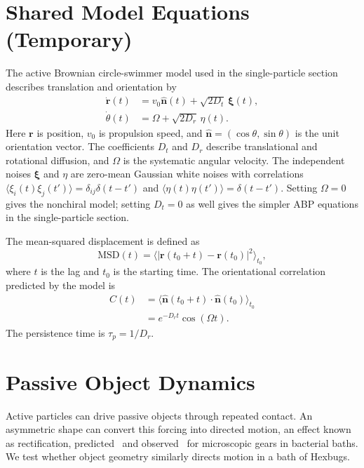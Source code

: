 \documentclass[10pt,twocolumn]{article}
\begin{document}
\section*{Shared Model Equations (Temporary)}
The active Brownian circle-swimmer model used in the single-particle section describes translation and orientation by~\cite{Balda2022,Kiechl2026}
\begin{equation}
  \begin{aligned}
    \dot{\mathbf r}(t)&=v_0\hat{\mathbf n}(t)+\sqrt{2D_t}\,\boldsymbol\xi(t),\\
    \dot\theta(t)&=\Omega+\sqrt{2D_r}\,\eta(t).
  \end{aligned}
  \label{eq:shared_abc}
\end{equation}
Here $\mathbf r$ is position, $v_0$ is propulsion speed, and $\hat{\mathbf n}=(\cos\theta,\sin\theta)$ is the unit orientation vector.
The coefficients $D_t$ and $D_r$ describe translational and rotational diffusion, and $\Omega$ is the systematic angular velocity.
The independent noises $\boldsymbol\xi$ and $\eta$ are zero-mean Gaussian white noises with correlations $\langle\xi_i(t)\xi_j(t')\rangle=\delta_{ij}\delta(t-t')$ and $\langle\eta(t)\eta(t')\rangle=\delta(t-t')$.
Setting $\Omega=0$ gives the nonchiral model; setting $D_t=0$ as well gives the simpler ABP equations in the single-particle section.

The mean-squared displacement is defined as
\begin{equation}
  \mathrm{MSD}(t)=\big\langle|\mathbf r(t_0+t)-\mathbf r(t_0)|^2\big\rangle_{t_0},
  \label{eq:shared_msd}
\end{equation}
where $t$ is the lag and $t_0$ is the starting time.
The orientational correlation predicted by the model is
\begin{equation}
  \begin{aligned}
    C(t)&=\big\langle\hat{\mathbf n}(t_0+t)\cdot\hat{\mathbf n}(t_0)\big\rangle_{t_0}\\
        &=e^{-D_r t}\cos(\Omega t).
  \end{aligned}
  \label{eq:shared_corr}
\end{equation}
The persistence time is $\tau_p=1/D_r$.

\section*{Passive Object Dynamics}

Active particles can drive passive objects through repeated contact.
An asymmetric shape can convert this forcing into directed motion, an effect known as rectification, predicted~\cite{Angelani2009} and observed~\cite{DiLeonardo2010} for microscopic gears in bacterial baths.
We test whether object geometry similarly directs motion in a bath of Hexbugs.
\end{document}
